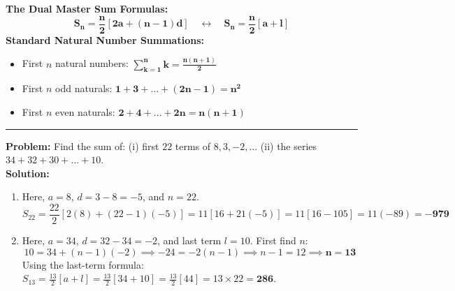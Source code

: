 \documentclass[10pt,a4paper]{article}
\newcommand{\subhead}[1]{%
  \vspace{0.8mm}{\large\bfseries\color{navy}#1}\par\vspace{0.2mm}
  {\color{gold}\rule{14mm}{1.1pt}}\par\vspace{0.6mm}
}
\begin{document}
\vspace{0.6mm}
\begin{minipage}[c]{0.45\textwidth}
\centering
{}
\end{minipage}\hfill
\begin{minipage}[c]{0.52\textwidth}
\begin{formulaBox}
  \textbf{The Dual Master Sum Formulas:}
  $$\mathbf{S_n = \frac{n}{2}[2a + (n - 1)d]} \quad \longleftrightarrow \quad \mathbf{S_n = \frac{n}{2}[a + l]}$$
  \textbf{Standard Natural Number Summations:}
  \begin{itemize}
    \item First $n$ natural numbers: $\mathbf{\sum_{k=1}^n k = \frac{n(n + 1)}{2}}$
    \item First $n$ odd naturals: $\mathbf{1 + 3 + \dots + (2n-1) = n^2}$
    \item First $n$ even naturals: $\mathbf{2 + 4 + \dots + 2n = n(n + 1)}$
  \end{itemize}
\end{formulaBox}
\end{minipage}

\vspace{0.8mm}
\subhead{5.2 Direct Sum Applications}

\begin{conceptBox}[title={Worked Archetype 5 $\vert$ Direct Application of Sum Formulas},fonttitle=\bfseries\color{navy}]
  \textbf{Problem:} Find the sum of: (i) first $22$ terms of $8, 3, -2, \dots$ (ii) the series $34 + 32 + 30 + \dots + 10$.\\
  \textbf{Solution:}
  \begin{enumerate}
    \item Here, $a = 8$, $d = 3 - 8 = -5$, and $n = 22$.
      $$S_{22} = \frac{22}{2}[2(8) + (22 - 1)(-5)] = 11[16 + 21(-5)] = 11[16 - 105] = 11(-89) = \mathbf{-979}$$
    \item Here, $a = 34$, $d = 32 - 34 = -2$, and last term $l = 10$. First find $n$:
      $$10 = 34 + (n - 1)(-2) \implies -24 = -2(n - 1) \implies n - 1 = 12 \implies \mathbf{n = 13}$$
      Using the last-term formula: $S_{13} = \frac{13}{2}[a + l] = \frac{13}{2}[34 + 10] = \frac{13}{2}[44] = 13 \times 22 = \mathbf{286}$.
  \end{enumerate}
\end{conceptBox}
\end{document}
